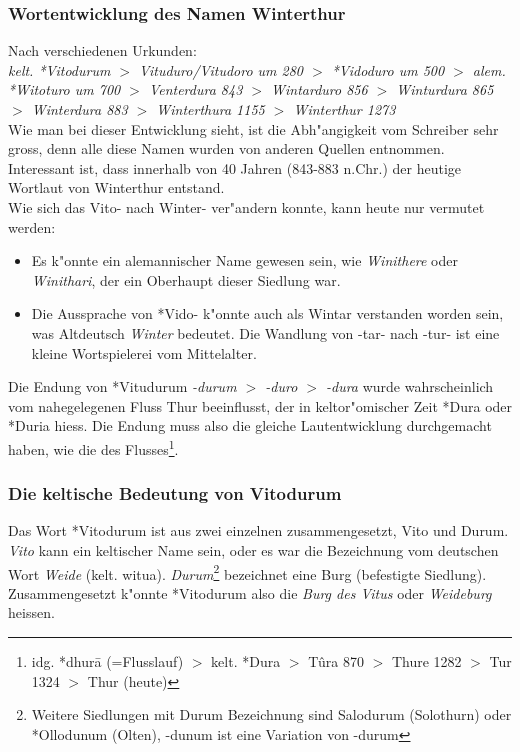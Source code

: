\documentclass[10pt]{article}
\begin{document}
\subsubsection{Wortentwicklung des Namen Winterthur}
Nach verschiedenen Urkunden:\\
{\sl kelt. *Vitodurum $>$ Vituduro/Vitudoro um 280 $>$ *Vidoduro um 500 $>$
alem. *Witoturo um 700 $>$ Venterdura 843 $>$ Wintarduro 856 $>$
Winturdura 865 $>$ Winterdura 883 $>$ Winterthura 1155 $>$ Winterthur 1273}\\
Wie man bei dieser Entwicklung sieht, ist die Abh"angigkeit vom Schreiber sehr
gross, denn alle diese Namen wurden von anderen Quellen entnommen. Interessant
ist, dass innerhalb von 40 Jahren (843-883 n.Chr.) der heutige
Wortlaut von Winterthur entstand.\\
Wie sich das Vito- nach Winter- ver"andern konnte, kann heute nur vermutet
werden:
\begin{itemize}
  \item Es k"onnte ein alemannischer Name gewesen sein, wie {\sl Winithere} oder
        {\sl Winithari}, der ein Oberhaupt dieser Siedlung war.
  \item Die Aussprache von *Vido- k"onnte auch als Wintar verstanden worden
        sein, was Altdeutsch {\sl Winter} bedeutet. Die Wandlung von -tar-
        nach -tur- ist eine kleine Wortspielerei vom Mittelalter.
\end{itemize}
Die Endung von *Vitudurum {\sl -durum $>$ -duro $>$ -dura} wurde wahrscheinlich
vom nahegelegenen Fluss Thur beeinflusst, der in keltor"omischer Zeit *Dura
oder *Duria hiess. Die Endung muss also die gleiche Lautentwicklung
durchgemacht haben, wie die des Flusses\footnote{idg. *dhur\=a (=Flusslauf) $>$ kelt. *Dura
$>$ T\^ura 870 $>$ Thure 1282 $>$ Tur 1324 $>$ Thur (heute)}.

\subsubsection{Die keltische Bedeutung von Vitodurum}
Das Wort *Vitodurum ist aus zwei einzelnen zusammengesetzt, Vito und Durum.
{\sl Vito} kann ein keltischer Name sein, oder es war die Bezeichnung vom
deutschen Wort {\sl Weide} (kelt. witua). {\sl Durum}\footnote{Weitere
Siedlungen mit Durum Bezeichnung sind Salodurum (Solothurn) oder *Ollodunum
(Olten), -dunum ist eine Variation von -durum} bezeichnet eine Burg
(befestigte Siedlung). Zusammengesetzt k"onnte *Vitodurum also die {\sl Burg
des Vitus} oder {\sl Weideburg} heissen. 
\end{document}

